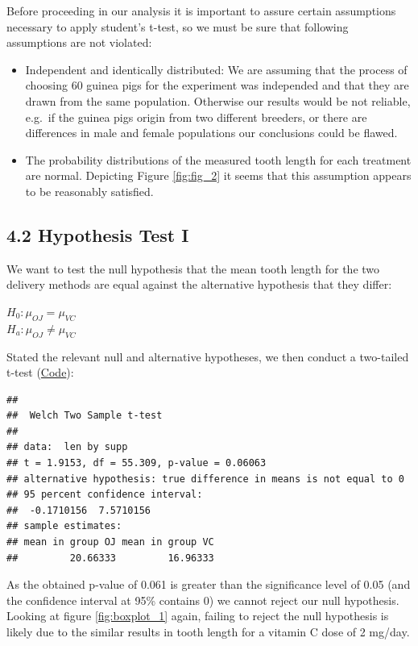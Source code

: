 \documentclass[]{article}
\begin{document}
Before proceeding in our analysis it is important to assure certain
assumptions necessary to apply student's t-test, so we must be sure that
following assumptions are not violated:

\begin{itemize}
\item
  Independent and identically distributed: We are assuming that the
  process of choosing 60 guinea pigs for the experiment was independed
  and that they are drawn from the same population. Otherwise our
  results would be not reliable, e.g.~if the guinea pigs origin from two
  different breeders, or there are differences in male and female
  populations our conclusions could be flawed.
\item
  The probability distributions of the measured tooth length for each
  treatment are normal. Depicting Figure \ref{fig:fig_2} it seems that
  this assumption appears to be reasonably satisfied.
\end{itemize}

\subsection{4.2 Hypothesis Test I}\label{hypothesis-test-i}

We want to test the null hypothesis that the mean tooth length for the
two delivery methods are equal against the alternative hypothesis that
they differ:

\(H_0:\mu_{OJ}=\mu_{VC}\)\\
\(H_a:\mu_{OJ}\neq\mu_{VC}\)

Stated the relevant null and alternative hypotheses, we then conduct a
two-tailed t-test (\protect\hyperlink{Appendix_2}{Code}):

\begin{verbatim}
## 
##  Welch Two Sample t-test
## 
## data:  len by supp
## t = 1.9153, df = 55.309, p-value = 0.06063
## alternative hypothesis: true difference in means is not equal to 0
## 95 percent confidence interval:
##  -0.1710156  7.5710156
## sample estimates:
## mean in group OJ mean in group VC 
##         20.66333         16.96333
\end{verbatim}

As the obtained p-value of 0.061 is greater than the significance level
of 0.05 (and the confidence interval at 95\% contains 0) we cannot
reject our null hypothesis. Looking at figure \ref{fig:boxplot_1} again,
failing to reject the null hypothesis is likely due to the similar
results in tooth length for a vitamin C dose of 2 mg/day.
\end{document}
